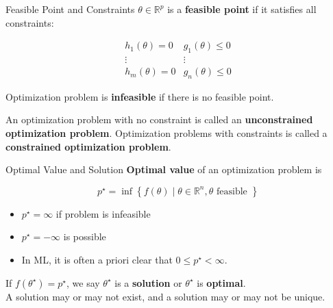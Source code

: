 \begin{frame}[allowframebreaks]

\begin{mydefinitionblock}{1.2}{Feasible Point and Constraints}
    $\theta \in \mathbb{R}^{p}$ is a \textbf{feasible point} if it satisfies all constraints:

    $$
    \begin{array}{cc}
    h_{1}(\theta)=0 & g_{1}(\theta) \leq 0 \\
    \vdots & \vdots \\
    h_{m}(\theta)=0 & g_{n}(\theta) \leq 0
    \end{array}
    $$

    Optimization problem is \textbf{infeasible} if there is no feasible point.

    An optimization problem with no constraint is called an \textbf{unconstrained optimization problem}. Optimization problems with constraints is called a \textbf{constrained optimization problem}.
\end{mydefinitionblock}

\end{frame}

\begin{frame}[allowframebreaks]

\begin{mydefinitionblock}{1.3}{Optimal Value and Solution}
    \textbf{Optimal value} of an optimization problem is

    $$
    p^{\star}=\inf \left\{f(\theta) \mid \theta \in \mathbb{R}^{n}, \theta \text { feasible }\right\}
    $$

    \begin{itemize}
        \item $p^{\star}=\infty$ if problem is infeasible
        \item $p^{\star}=-\infty$ is possible
        \item In ML, it is often a priori clear that $0 \leq p^{\star}<\infty$.
    \end{itemize}

    If $f\left(\theta^{\star}\right)=p^{\star}$, we say $\theta^{\star}$ is a \textbf{solution} or $\theta^{\star}$ is \textbf{optimal}.\\
    A solution may or may not exist, and a solution may or may not be unique.
\end{mydefinitionblock}

\end{frame}

